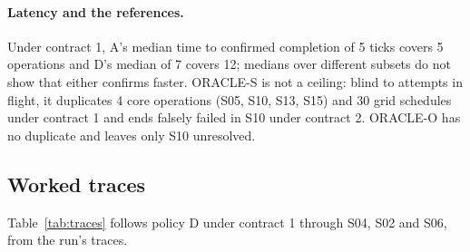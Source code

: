 \documentclass[11pt]{article}
\begin{document}
\paragraph{Latency and the references.} Under contract 1, A's median time to confirmed completion of 5 ticks covers 5 operations and D's median of 7 covers 12; medians over different subsets do not show that either confirms faster. ORACLE-S is not a ceiling: blind to attempts in flight, it duplicates 4 core operations (S05, S10, S13, S15) and 30 grid schedules under contract 1 and ends falsely failed in S10 under contract 2. ORACLE-O has no duplicate and leaves only S10 unresolved.

\subsection{Worked traces}\label{sec:traces}

Table~\ref{tab:traces} follows policy D under contract 1 through S04, S02 and S06, from the run's traces.
\end{document}

